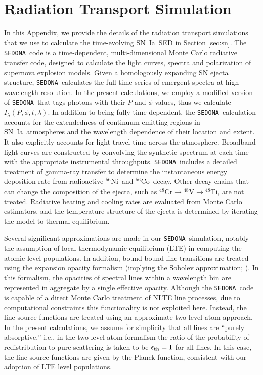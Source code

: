 \documentclass[iop,apj,numberedappendix,twocolappendix]{emulateapj}
\newcommand{\snia}{{\rm SN~Ia}}
\newcommand{\Nifs}{\ensuremath{^{56}\mathrm{Ni}}}
\newcommand{\Cofs}{\ensuremath{^{56}\mathrm{Co}}}
\newcommand{\MCcode}{\texttt{SEDONA}}
\newcommand{\Crfe}{\ensuremath{^{48}\mathrm{Cr}}}
\newcommand{\Vfe}{\ensuremath{^{48}\mathrm{V}}}
\newcommand{\Tife}{\ensuremath{^{48}\mathrm{Ti}}}
\begin{document}
\appendix
\section{Radiation Transport Simulation}
\label{sec:sedona}
In this Appendix, we provide the details of the radiation transport simulations that we use to calculate the time-evolving \snia\ SED  in Section \ref{sec:sn}.
The \MCcode\ code \citep{sedona} is a time-dependent, multi-dimensional Monte Carlo radiative transfer code, designed to calculate the light curves, spectra and polarization of supernova explosion models.
Given a homologously expanding SN ejecta structure, \MCcode\ calculates the full time series of emergent spectra at high wavelength resolution.
In the present calculations, we employ a modified version of \MCcode\ that tags photons with their $P$ and $\phi$ values, thus we calculate $I_\lambda(P, \phi, t, \lambda)$. 
In addition to being fully time-dependent, the \MCcode\ calculation  accounts for the extendedness of continuum emitting regions in \snia\ atmospheres and the wavelength dependence of their location and extent.
It also explicitly accounts for light travel time across the atmosphere.
Broadband light curves are constructed by convolving the synthetic spectrum at each time with the appropriate instrumental throughputs.
\MCcode\ includes a detailed treatment of gamma-ray transfer to determine the instantaneous energy deposition rate from radioactive \Nifs\ and \Cofs\ decay.
Other decay chains that can change the composition of the ejecta, such as $\Crfe \rightarrow \Vfe \rightarrow \Tife$, are not treated.
Radiative heating and cooling rates are evaluated from Monte Carlo estimators, and the temperature structure of the ejecta is determined by iterating the model to thermal equilibrium.

Several significant approximations are made in our \MCcode\ simulation, notably the assumption of local thermodynamic equilibrium (LTE) in computing the atomic level populations.
In addition, bound-bound line transitions are treated using the expansion opacity formalism (implying the Sobolev approximation; \citealt{jeffery95}).
In this formalism, the opacities of spectral lines within a wavelength bin are represented in aggregate by a single effective opacity.
Although the \MCcode\ code is capable of a direct Monte Carlo treatment of NLTE line processes, due to computational constraints this functionality is not exploited here.
Instead, the line source functions are treated using an approximate two-level atom approach.
In the present calculations, we assume for simplicity that all lines are ``purely absorptive,'' i.e., in the two-level atom formalism the ratio of the probability of redistribution to pure scattering is taken to be $\epsilon_{\rm th} = 1$ for all lines.
In this case, the line source functions are given by the Planck function, consistent with our adoption of LTE level populations.
\end{document}
